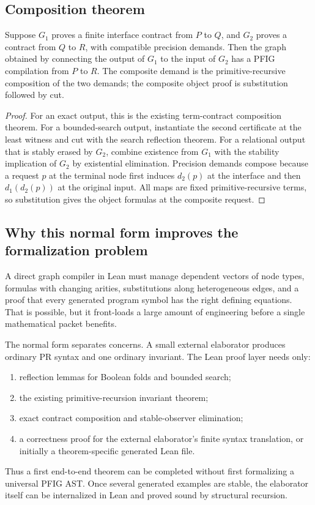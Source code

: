 \subsection{Composition theorem}

\begin{theorem}
\label{thm:pfig-composition}
Suppose \(G_1\) proves a finite interface contract from \(P\) to \(Q\), and \(G_2\) proves a contract from \(Q\) to \(R\), with compatible precision demands.  Then the graph obtained by connecting the output of \(G_1\) to the input of \(G_2\) has a PFIG compilation from \(P\) to \(R\).  The composite demand is the primitive-recursive composition of the two demands; the composite object proof is substitution followed by cut.
\end{theorem}

\begin{proof}
For an exact output, this is the existing term-contract composition theorem.  For a bounded-search output, instantiate the second certificate at the least witness and cut with the search reflection theorem.  For a relational output that is stably erased by \(G_2\), combine existence from \(G_1\) with the stability implication of \(G_2\) by existential elimination.  Precision demands compose because a request \(p\) at the terminal node first induces \(d_2(p)\) at the interface and then \(d_1(d_2(p))\) at the original input.  All maps are fixed primitive-recursive terms, so substitution gives the object formulas at the composite request.
\end{proof}

\subsection{Why this normal form improves the formalization problem}

A direct graph compiler in Lean must manage dependent vectors of node types, formulas with changing arities, substitutions along heterogeneous edges, and a proof that every generated program symbol has the right defining equations.  That is possible, but it front-loads a large amount of engineering before a single mathematical packet benefits.

The normal form separates concerns.  A small external elaborator produces ordinary PR syntax and one ordinary invariant.  The Lean proof layer needs only:

\begin{enumerate}
\item reflection lemmas for Boolean folds and bounded search;
\item the existing primitive-recursion invariant theorem;
\item exact contract composition and stable-observer elimination;
\item a correctness proof for the external elaborator's finite syntax translation, or initially a theorem-specific generated Lean file.
\end{enumerate}

Thus a first end-to-end theorem can be completed without first formalizing a universal PFIG AST.  Once several generated examples are stable, the elaborator itself can be internalized in Lean and proved sound by structural recursion.
